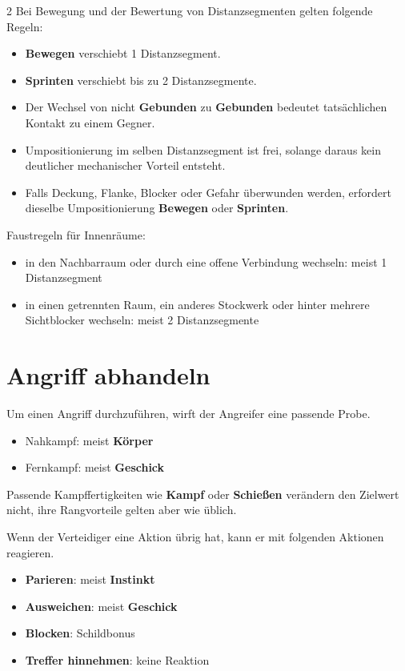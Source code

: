 \begin{multicols*}{2}
Bei Bewegung und der Bewertung von Distanzsegmenten gelten folgende Regeln:

\begin{itemize}[leftmargin=*]
\item \textbf{Bewegen} verschiebt 1 Distanzsegment.
\item \textbf{Sprinten} verschiebt bis zu 2 Distanzsegmente.
\item Der Wechsel von nicht \textbf{Gebunden} zu \textbf{Gebunden} bedeutet tatsächlichen Kontakt zu einem Gegner.
\item Umpositionierung im selben Distanzsegment ist frei, solange daraus kein deutlicher mechanischer Vorteil entsteht.
\item Falls Deckung, Flanke, Blocker oder Gefahr überwunden werden, erfordert dieselbe Umpositionierung \textbf{Bewegen} oder \textbf{Sprinten}.
\end{itemize}

Faustregeln für Innenräume:

\begin{itemize}[leftmargin=*]
\item in den Nachbarraum oder durch eine offene Verbindung wechseln: meist 1 Distanzsegment
\item in einen getrennten Raum, ein anderes Stockwerk oder hinter mehrere Sichtblocker wechseln: meist 2 Distanzsegmente
\end{itemize}

\section{Angriff abhandeln}\label{sec:angriff-auflosen}

Um einen Angriff durchzuführen, wirft der Angreifer eine passende Probe.

\begin{itemize}[leftmargin=*]
\item Nahkampf: meist \textbf{Körper}
\item Fernkampf: meist \textbf{Geschick}
\end{itemize}

Passende Kampffertigkeiten wie \textbf{Kampf} oder \textbf{Schießen} verändern den Zielwert nicht, ihre Rangvorteile gelten aber wie üblich.

Wenn der Verteidiger eine Aktion übrig hat, kann er mit folgenden Aktionen reagieren.

\begin{itemize}[leftmargin=*]
\item \textbf{Parieren}: meist \textbf{Instinkt}
\item \textbf{Ausweichen}: meist \textbf{Geschick}
\item \textbf{Blocken}: Schildbonus
\item \textbf{Treffer hinnehmen}: keine Reaktion
\end{itemize}


\end{multicols*}

